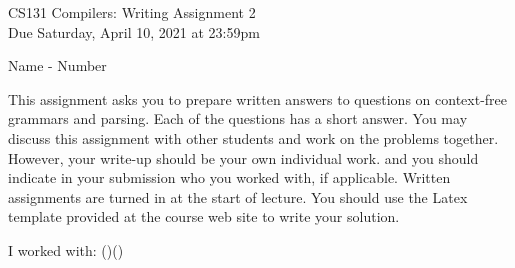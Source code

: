 \documentclass[10pt]{article}
\begin{document}
\begin{center}
\Large CS131 Compilers: Writing Assignment 2\\Due Saturday, April 10, 2021 at 23:59pm
\end{center}

\begin{center}
\LARGE Name - Number
\end{center}

This assignment asks you to prepare written answers to questions on
context-free grammars and parsing. Each of the questions has a short answer. You
may discuss this assignment with other students and work on the problems
together. However, your write-up should be your own individual work.
and you should indicate in your submission who you worked with, if applicable.
Written assignments are turned in at the start of lecture.
You should use the Latex template provided at the course web site to write your solution.

\begin{center}
I worked with: ()()
\end{center}
\end{document}

